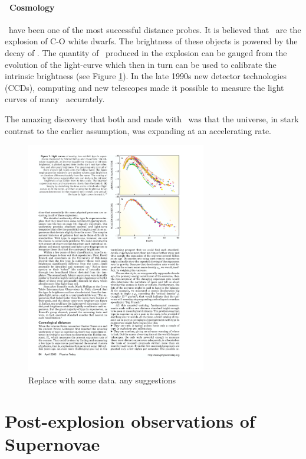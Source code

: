 \paragraph{\snia\ Cosmology}
\sneia\ have been one of the most successful distance probes. It is believed that \sneia\ are the explosion of C-O white dwarfs. The brightness of these objects is powered by the decay of \Ni. The quantity of \Ni\ produced in the explosion can be gauged from the evolution of the light-curve which then in turn can be used to calibrate the intrinsic brightness (see Figure \ref{fig:normalized_lightcurve}).
In the late 1990s new detector technologies (CCDs), computing and new telescopes made it possible to measure the light curves of many \sneia\ accurately. 

The amazing discovery that both \citet{1998AJ....116.1009R} and \citet{1999ApJ...517..565P} made with \sneia\ was that the universe, in stark contrast to the earlier assumption, was expanding at an accelerating rate. 

\begin{figure}[htbp] %
   \centering
   \includegraphics[width=0.7\textwidth]{chapter_intro/plots/lightcurve_scaled_perlmutter2003.pdf} 
   \caption{Replace with some data. any suggestions}
   \label{fig:normalized_lightcurve}
\end{figure}

\section{Post-explosion observations of Supernovae}

